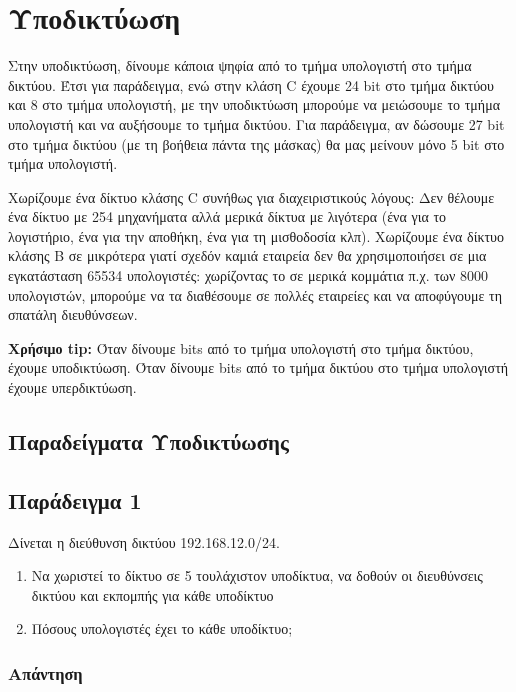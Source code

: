 \section*{Υποδικτύωση}

Στην υποδικτύωση, δίνουμε κάποια ψηφία από το τμήμα υπολογιστή στο τμήμα δικτύου. Έτσι για παράδειγμα, ενώ στην κλάση C έχουμε 24 bit στο τμήμα δικτύου και 8 στο τμήμα υπολογιστή, με την υποδικτύωση μπορούμε να μειώσουμε το τμήμα υπολογιστή και να αυξήσουμε το τμήμα δικτύου. Για παράδειγμα, αν δώσουμε 27 bit στο τμήμα δικτύου (με τη βοήθεια πάντα της μάσκας) θα μας μείνουν μόνο 5 bit στο τμήμα υπολογιστή. 

Χωρίζουμε ένα δίκτυο κλάσης C συνήθως για διαχειριστικούς λόγους: Δεν θέλουμε ένα δίκτυο με 254 μηχανήματα αλλά μερικά δίκτυα με λιγότερα (ένα για το λογιστήριο, ένα για την αποθήκη, ένα για τη μισθοδοσία κλπ). Χωρίζουμε ένα δίκτυο κλάσης B σε μικρότερα γιατί σχεδόν καμιά εταιρεία δεν θα χρησιμοποιήσει σε μια εγκατάσταση 65534 υπολογιστές: χωρίζοντας το σε μερικά κομμάτια π.χ. των 8000 υπολογιστών, μπορούμε να τα διαθέσουμε σε πολλές εταιρείες και να αποφύγουμε τη σπατάλη διευθύνσεων.

\begin{inthebox}
\textbf{Χρήσιμο tip:} Όταν δίνουμε bits από το τμήμα υπολογιστή στο τμήμα δικτύου, έχουμε υποδικτύωση. Όταν δίνουμε bits από το τμήμα δικτύου στο τμήμα υπολογιστή έχουμε υπερδικτύωση.\\
\end{inthebox}

\subsection*{Παραδείγματα Υποδικτύωσης}
\subsection*{Παράδειγμα 1}

Δίνεται η διεύθυνση δικτύου 192.168.12.0/24.

\begin{enumerate}
\item Να χωριστεί το δίκτυο σε 5 τουλάχιστον υποδίκτυα, να δοθούν οι διευθύνσεις δικτύου και εκπομπής για κάθε υποδίκτυο
\item Πόσους υπολογιστές έχει το κάθε υποδίκτυο;
\end{enumerate}

\subsubsection*{Απάντηση}

